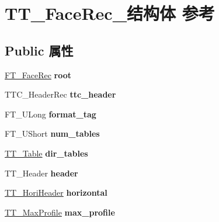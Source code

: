 \hypertarget{struct_t_t___face_rec__}{}\section{T\+T\+\_\+\+Face\+Rec\+\_\+结构体 参考}
\label{struct_t_t___face_rec__}
\subsection*{Public 属性}
\begin{DoxyCompactItemize}
\item 
\mbox{\label{struct_t_t___face_rec___ab07a1f6ce2cffe73a5501fb33164ae74}} 
\hyperlink{struct_f_t___face_rec__}{F\+T\+\_\+\+Face\+Rec} {\bfseries root}
\item 
\mbox{\label{struct_t_t___face_rec___a9cde4ce9550411379eef0791afef8943}} 
T\+T\+C\+\_\+\+Header\+Rec {\bfseries ttc\+\_\+header}
\item 
\mbox{\label{struct_t_t___face_rec___ae492c009d7c3dd1b7279f6596edb84af}} 
F\+T\+\_\+\+U\+Long {\bfseries format\+\_\+tag}
\item 
\mbox{\label{struct_t_t___face_rec___aa32df24e9bbbbc72117bfeb964028b6e}} 
F\+T\+\_\+\+U\+Short {\bfseries num\+\_\+tables}
\item 
\mbox{\label{struct_t_t___face_rec___ae4480c53c6414c74919fc99c9192adfe}} 
\hyperlink{struct_t_t___table_rec__}{T\+T\+\_\+\+Table} {\bfseries dir\+\_\+tables}
\item 
\mbox{\label{struct_t_t___face_rec___ac5fc04850d7b223029891601ed605b34}} 
T\+T\+\_\+\+Header {\bfseries header}
\item 
\mbox{\label{struct_t_t___face_rec___a784d2ca39e9717da0661f5fd59dffc58}} 
\hyperlink{struct_t_t___hori_header__}{T\+T\+\_\+\+Hori\+Header} {\bfseries horizontal}
\item 
\mbox{\label{struct_t_t___face_rec___a1bacbea2875d5fda567a5f561773035d}} 
\hyperlink{struct_t_t___max_profile__}{T\+T\+\_\+\+Max\+Profile} {\bfseries max\+\_\+profile}

\end{DoxyCompactItemize}
